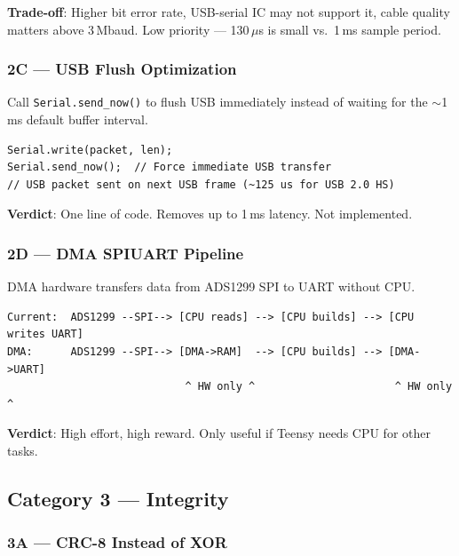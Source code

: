 \documentclass[11pt,a4paper]{article}
\begin{document}
{\sloppy \textbf{Trade-off}: Higher bit error rate, USB-serial IC may not support it, cable quality matters above 3\,Mbaud.
Low priority --- 130\,$\mu$s is small vs.\ 1\,ms sample period.\par}

\subsubsection{2C --- USB Flush Optimization}

Call \texttt{Serial.send\_now()} to flush USB immediately instead of waiting for the ${\sim}$1\,ms default buffer interval.

\begin{lstlisting}[style=cpp, caption={USB flush optimization}]
Serial.write(packet, len);
Serial.send_now();  // Force immediate USB transfer
// USB packet sent on next USB frame (~125 us for USB 2.0 HS)
\end{lstlisting}

\textbf{Verdict}: One line of code. Removes up to 1\,ms latency. Not implemented.

\subsubsection{\texorpdfstring{2D --- DMA SPI\textrightarrow UART Pipeline}{2D --- DMA SPI to UART Pipeline}}

DMA hardware transfers data from ADS1299 SPI to UART without CPU.

\begin{lstlisting}[style=diagram, caption={CPU-mediated vs.\ DMA data flow}]
Current:  ADS1299 --SPI--> [CPU reads] --> [CPU builds] --> [CPU writes UART]
DMA:      ADS1299 --SPI--> [DMA->RAM]  --> [CPU builds] --> [DMA->UART]
                            ^ HW only ^                      ^ HW only ^
\end{lstlisting}

\textbf{Verdict}: High effort, high reward. Only useful if Teensy needs CPU for other tasks.

\subsection{Category 3 --- Integrity}

\subsubsection{3A --- CRC-8 Instead of XOR}
\end{document}
